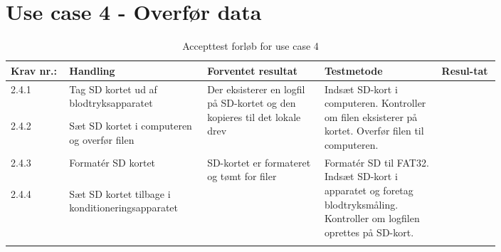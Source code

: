 \newpage
\section{Use case 4 - Overfør data}
				\begin{longtable}{|p{0.1\linewidth}|p{0.2\linewidth}|p{0.2\linewidth}|p{0.2\linewidth}|p{0.1\linewidth}|}
							\hline
							\rowcolor{usDef}
							Krav nr.: & Handling & Forventet resultat & Testmetode & Resul-tat  \\\hline
							2.4.1 & Tag SD kortet ud af blodtryksapparatet  & \multirow{2}{\linewidth}{Der eksisterer en logfil på SD-kortet og den kopieres til det lokale drev}& \multirow{2}{\linewidth}{Indsæt SD-kort i computeren. Kontroller om filen eksisterer på kortet. Overfør filen til computeren.}& \multirow{2}{\linewidth}{} \\ [2cm]\cline{1-2}
							2.4.2 & Sæt SD kortet i computeren og overfør filen & & & \\ \hline
							2.4.3 & Formatér SD kortet & \multirow{2}{\linewidth}{SD-kortet er formateret og tømt for filer} & \multirow{2}{\linewidth}{Formatér SD til FAT32. Indsæt SD-kort i apparatet og foretag blodtryksmåling. Kontroller om logfilen oprettes på SD-kort. } & \multirow{2}{\linewidth}{}\\ [3cm]\cline{1-2}
							2.4.4 & Sæt SD kortet tilbage i konditioneringsapparatet & & & \\ \hline
							\caption{Accepttest forløb for use case 4}
				\end{longtable}